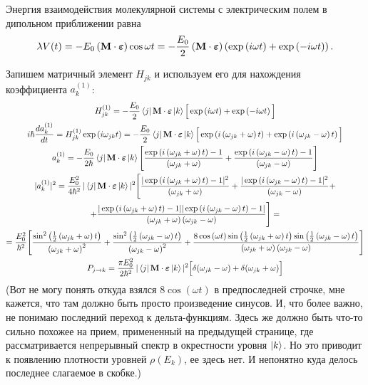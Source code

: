 \documentclass[12pt]{article}
\newcommand{\lb}{\left(}
\newcommand{\rb}{\right)}
\newcommand{\mf}{\mathbf}
\newcommand{\vverh}{\vspace*{-0.15cm}}
\begin{document}
Энергия взаимодействия молекулярной системы с электрическим полем в дипольном приближении равна
\vverh
\begin{gather}
	\lambda V(t) = - E_0 \lb \mf{M} \cdot \boldsymbol{\varepsilon} \rb \cos \omega t = - \frac{E_0}{2} \lb \mf{M} \cdot \boldsymbol{\varepsilon} \rb \lb \exp \lb i \omega t \rb + \exp \lb - i \omega t \rb \rb .\notag
\end{gather}

Запишем матричный элемент $H_{jk}$  и используем его для нахождения коэффициента $a_k^{(1)}$:
\vverh
\begin{gather}
	H_{jk}^{(1)} = -\frac{E_0}{2} \bra{j} \mf{M} \cdot \boldsymbol{\varepsilon} \ket{k} \Big[ \exp \lb i \omega t \rb + \exp \lb - i \omega t \rb \Big] \notag \\
	i \hbar \frac{d a_k^{(1)}}{dt} = H_{jk}^{(1)} \exp \lb i \omega_{jk} t \rb = -\frac{E_0}{2} \bra{j} \mf{M} \cdot \boldsymbol{\varepsilon} \ket{k} \Big[ \exp \lb i \lb \omega_{jk} + \omega \rb t \rb + \exp \lb i \lb \omega_{jk} - \omega \rb t \rb \Big] \notag \\
	a_k^{(1)} = - \frac{E_0}{2 \hbar} \bra{j} \mf{M} \cdot \boldsymbol{\varepsilon} \ket{k} \Bigg[ \frac{ \exp \lb i \lb \omega_{jk} + \omega \rb t \rb - 1}{\lb \omega_{jk} + \omega \rb} + \frac{\exp \lb i \lb \omega_{jk} - \omega \rb t \rb - 1}{\lb \omega_{jk} - \omega \rb} \Bigg] \notag \\
	| a_k^{(1)} |^2 = \frac{E_0^2}{4 \hbar^2} \, | \bra{j} \mf{M} \cdot \boldsymbol{\varepsilon} \ket{k} |^2 \Bigg[ \frac{ | \exp \lb i \lb \omega_{jk} + \omega \rb t \rb - 1 |^2 }{\lb \omega_{jk} + \omega \rb } + \frac{| \exp \lb i \lb \omega_{jk} - \omega \rb t \rb  - 1|^2 }{ \lb \omega_{jk} - \omega \rb}+ \notag \\ 
	+ \frac{|\exp \lb i \lb \omega_{jk} + \omega \rb t \rb - 1 | | \exp \lb i \lb \omega_{jk} - \omega \rb t \rb - 1|}{\lb \omega_{jk} + \omega \rb \lb \omega_{jk} - \omega \rb} \Bigg] = \notag \\
	= \frac{E_0^2}{\hbar^2} \Bigg[ \frac{\sin^2 \lb \frac{1}{2} \lb \omega_{jk} + \omega \rb t \rb}{\lb \omega_{jk} + \omega \rb^2} + \frac{ \sin^2 \lb \frac{1}{2} \lb \omega_{jk} - \omega \rb t \rb}{ \lb \omega_{jk} - \omega \rb^2 } + \frac{8 \cos \lb \omega t \rb \sin \lb \frac{1}{2} \lb \omega_{jk} + \omega \rb t \rb \sin \lb \frac{1}{2} \lb \omega_{jk} - \omega \rb t \rb }{ \lb \omega_{jk} + \omega \rb \lb \omega_{jk} - \omega \rb} \Bigg] \notag \\
	P_{j \rightarrow k} = \frac{\pi E_0^2}{2 \hbar^2} \, | \bra{j} \mf{M} \cdot \boldsymbol{\varepsilon} \ket{k} |^2  \Big[ \delta(\omega_{jk} - \omega) + \delta( \omega_{jk} + \omega) \Big] \notag
\end{gather}
(Вот не могу понять откуда взялся $8 \cos \lb \omega t \rb$ в предпоследней строчке, мне кажется, что там должно быть просто произведение синусов. И, что более важно, не понимаю последний переход к дельта-функциям. Здесь же должно быть что-то сильно похожее на прием, примененный на предыдущей странице, где рассматривается непрерывный спектр в окрестности уровня $\ket{k}$. Но это приводит к появлению плотности уровней $\rho (E_k)$, ее здесь нет. И непонятно куда делось последнее слагаемое в скобке.) 
\end{document}
